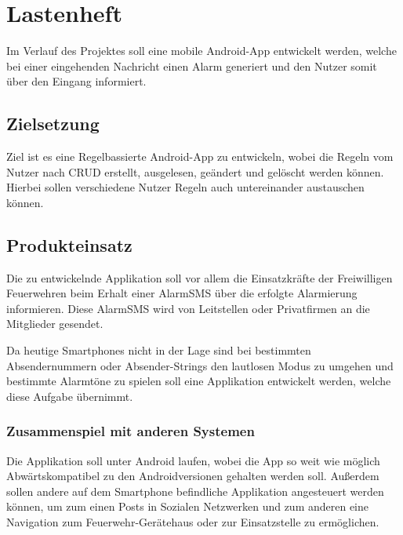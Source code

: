 \section{Lastenheft}
Im Verlauf des Projektes soll eine mobile Android-App entwickelt werden, welche bei einer eingehenden Nachricht einen Alarm generiert und den Nutzer somit \"uber den Eingang informiert.

\subsection{Zielsetzung}
Ziel ist es eine Regelbassierte Android-App zu entwickeln, wobei die Regeln vom Nutzer nach CRUD erstellt, ausgelesen, ge\"andert und gel\"oscht werden k\"onnen. Hierbei sollen verschiedene Nutzer Regeln auch untereinander austauschen k\"onnen.

\subsection{Produkteinsatz}
Die zu entwickelnde Applikation soll vor allem die Einsatzkr\"afte der Freiwilligen Feuerwehren beim Erhalt einer AlarmSMS \"uber die erfolgte Alarmierung informieren. Diese AlarmSMS wird von Leitstellen oder Privatfirmen an die Mitglieder gesendet.

Da heutige Smartphones nicht in der Lage sind bei bestimmten Absendernummern oder Absender-Strings den lautlosen Modus zu umgehen und bestimmte Alarmt\"one zu spielen soll eine Applikation entwickelt werden, welche diese Aufgabe \"ubernimmt.

\subsubsection{Zusammenspiel mit anderen Systemen}
Die Applikation soll unter Android laufen, wobei die App so weit wie m\"oglich Abw\"artskompatibel zu den Androidversionen gehalten werden soll. Au\ss{}erdem sollen andere auf dem Smartphone befindliche Applikation angesteuert werden k\"onnen, um zum einen Posts in Sozialen Netzwerken und zum anderen eine Navigation zum Feuerwehr-Ger\"atehaus oder zur Einsatzstelle zu erm\"oglichen.

